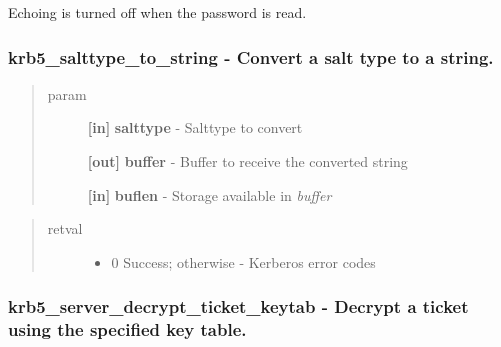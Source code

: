 \documentclass[letterpaper,10pt,english]{sphinxmanual}
\begin{document}
Echoing is turned off when the password is read.


\subsubsection{krb5\_salttype\_to\_string -  Convert a salt type to a string.}
\label{appdev/refs/api/krb5_salttype_to_string::doc}\label{appdev/refs/api/krb5_salttype_to_string:krb5-salttype-to-string-convert-a-salt-type-to-a-string}

\begin{fulllineitems}
\label{appdev/refs/api/krb5_salttype_to_string:c.krb5_salttype_to_string}
\end{fulllineitems}

\begin{quote}\begin{description}
\item[{param}] \leavevmode
\textbf{{[}in{]}} \textbf{salttype} - Salttype to convert

\textbf{{[}out{]}} \textbf{buffer} - Buffer to receive the converted string

\textbf{{[}in{]}} \textbf{buflen} - Storage available in \emph{buffer}

\end{description}\end{quote}
\begin{quote}\begin{description}
\item[{retval}] \leavevmode\begin{itemize}
\item {} 
0   Success; otherwise - Kerberos error codes

\end{itemize}

\end{description}\end{quote}


\subsubsection{krb5\_server\_decrypt\_ticket\_keytab -  Decrypt a ticket using the specified key table.}
\label{appdev/refs/api/krb5_server_decrypt_ticket_keytab:krb5-server-decrypt-ticket-keytab-decrypt-a-ticket-using-the-specified-key-table}\label{appdev/refs/api/krb5_server_decrypt_ticket_keytab::doc}
\end{document}

